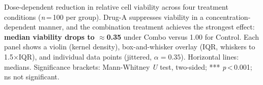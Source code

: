 \caption{Dose-dependent reduction in relative cell viability across four treatment conditions (\textit{n}\,=\,100 per group). Drug-A suppresses viability in a concentration-dependent manner, and the combination treatment achieves the strongest effect: \textbf{median viability drops to $\approx$0.35} under Combo versus 1.00 for Control. Each panel shows a violin (kernel density), box-and-whisker overlay (IQR, whiskers to 1.5$\times$IQR), and individual data points (jittered, $\alpha=0.35$). Horizontal lines: medians. Significance brackets: Mann-Whitney \textit{U} test, two-sided; *** \textit{p}\,<\,0.001; ns not significant.}
